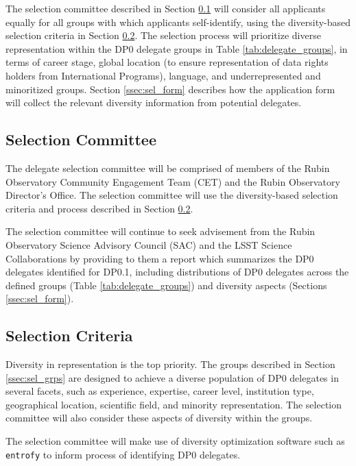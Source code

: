 \documentclass[DM,lsstdraft,authoryear,toc]{lsstdoc}
\begin{document}
The selection committee described in Section \ref{ssec:sel_comm} will consider all applicants equally for all groups with which applicants self-identify, using the diversity-based selection criteria in Section \ref{ssec:sel_crit}.
The selection process will prioritize diverse representation within the DP0 delegate groups in Table \ref{tab:delegate_groups}, in terms of career stage, global location (to ensure representation of data rights holders from International Programs), language, and underrepresented and minoritized groups.
Section \ref{ssec:sel_form} describes how the application form will collect the relevant diversity information from potential delegates.

\subsection{Selection Committee}\label{ssec:sel_comm}

The delegate selection committee will be comprised of members of the Rubin Observatory Community Engagement Team (CET) and the Rubin Observatory Director's Office.
The selection committee will use the diversity-based selection criteria and process described in Section \ref{ssec:sel_crit}.

The selection committee will continue to seek advisement from the Rubin Observatory Science Advisory Council (SAC) and the LSST Science Collaborations by providing to them a report which summarizes the DP0 delegates identified for DP0.1, including distributions of DP0 delegates across the defined groups (Table \ref{tab:delegate_groups}) and diversity aspects (Sections \ref{ssec:sel_form}).

\subsection{Selection Criteria}\label{ssec:sel_crit}

Diversity in representation is the top priority.
The groups described in Section \ref{ssec:sel_grps} are designed to achieve a diverse population of DP0 delegates in several facets, such as experience, expertise, career level, institution type, geographical location, scientific field, and minority representation.
The selection committee will also consider these aspects of diversity within the groups.

The selection committee will make use of diversity optimization software such as {\tt entrofy} \citep{2019arXiv190503314H} to inform process of identifying DP0 delegates.
\end{document}
